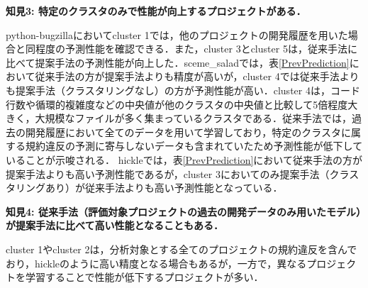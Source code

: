 \documentclass[T,J]{fose} %
\newcommand{\todo}[1]{\colorbox{yellow}{{\bf TODO}:}{\color{red} {\textbf{[#1]}}}}
\begin{document}
\noindent\textbf{知見3: 特定のクラスタのみで性能が向上するプロジェクトがある．}

python-bugzillaにおいてcluster 1では，他のプロジェクトの開発履歴を用いた場合と同程度の予測性能を確認できる．また，cluster 3とcluster 5は，従来手法に比べて提案手法の予測性能が向上した．sceme\_saladでは，表\ref{PrevPrediction}において従来手法の方が提案手法よりも精度が高いが，cluster 4では従来手法よりも提案手法（クラスタリングなし）の方が予測性能が高い．cluster 4は，コード行数や循環的複雑度などの中央値が他のクラスタの中央値と比較して5倍程度大きく，大規模なファイルが多く集まっているクラスタである．従来手法では，過去の開発履歴において全てのデータを用いて学習しており，特定のクラスタに属する規約違反の予測に寄与しないデータも含まれていたため予測性能が低下していることが示唆される．
hickleでは，表\ref{PrevPrediction}において従来手法の方が提案手法よりも高い予測性能であるが，cluster 3においてのみ提案手法（クラスタリングあり）が従来手法よりも高い予測性能となっている．

\noindent\textbf{知見4: 従来手法（評価対象プロジェクトの過去の開発データのみ用いたモデル）が提案手法に比べて高い性能となることもある．}

cluster 1やcluster 2は，分析対象とする全てのプロジェクトの規約違反を含んでおり，hickleのように高い精度となる場合もあるが，一方で，異なるプロジェクトを学習することで性能が低下するプロジェクトが多い．





\end{document}
